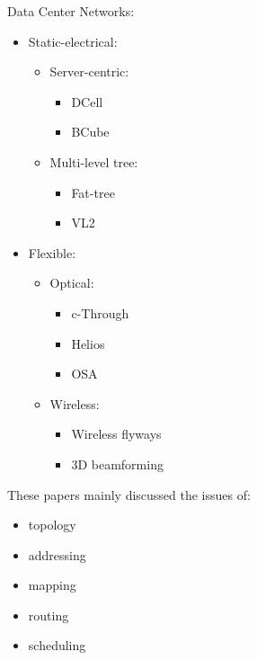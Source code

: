 \documentclass[journal,onecolumn,11pt]{IEEEtran}
\begin{document}
Data Center Networks:
\begin{itemize}
  \item Static-electrical:
  \begin{itemize}
    \item Server-centric:
    \begin{itemize}
      \item DCell\cite{Guo:2008:DSF:1402958.1402968}
      \item BCube\cite{Guo:2009:BHP:1592568.1592577}
    \end{itemize}
    \item Multi-level tree:
    \begin{itemize}
      \item Fat-tree\cite{Al-Fares:2008:SCD:1402958.1402967}
      \item VL2\cite{Greenberg:2009:VSF:1592568.1592576}
    \end{itemize}
  \end{itemize}
  \item Flexible:
  \begin{itemize}
    \item Optical:
    \begin{itemize}
      \item c-Through\cite{Wang:2010:CPO:1851182.1851222}
      \item Helios\cite{Farrington:2010:HHE:1851182.1851223}
      \item OSA\cite{chen2012osa}
    \end{itemize}
    \item Wireless:
    \begin{itemize}
      \item Wireless flyways\cite{Halperin:2011:ADC:2018436.2018442}
      \item 3D beamforming\cite{Zhou:2012:MMC:2342356.2342440}
    \end{itemize}
  \end{itemize}
\end{itemize}

These papers mainly discussed the issues of:
\begin{itemize}
  \item topology \cite{Al-Fares:2008:SCD:1402958.1402967,Greenberg:2009:VSF:1592568.1592576,Guo:2008:DSF:1402958.1402968,Guo:2009:BHP:1592568.1592577}
  \item addressing \cite{Al-Fares:2008:SCD:1402958.1402967,Greenberg:2009:VSF:1592568.1592576}
  \item mapping \cite{Chen:2010:GAA:1851182.1851190,Greenberg:2009:VSF:1592568.1592576}
  \item routing \cite{Guo:2008:DSF:1402958.1402968,Guo:2009:BHP:1592568.1592577}
  \item scheduling \cite{Al-Fares:2008:SCD:1402958.1402967,Halperin:2011:ADC:2018436.2018442}
\end{itemize}
\end{document}
